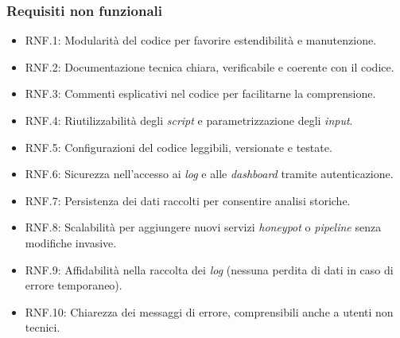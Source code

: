 \subsubsection*{Requisiti non funzionali}
\begin{itemize}[noitemsep, topsep=0pt]
    \item RNF.1: Modularità del codice per favorire estendibilità e manutenzione.
    \item RNF.2: Documentazione tecnica chiara, verificabile e coerente con il codice.
    \item RNF.3: Commenti esplicativi nel codice per facilitarne la comprensione.
    \item RNF.4: Riutilizzabilità degli \textit{script} e parametrizzazione degli \textit{input}.
    \item RNF.5: Configurazioni del codice leggibili, versionate e testate.
    \item RNF.6: Sicurezza nell'accesso ai \textit{log} e alle \textit{dashboard} tramite autenticazione.
    \item RNF.7: Persistenza dei dati raccolti per consentire analisi storiche.
    \item RNF.8: Scalabilità per aggiungere nuovi servizi \textit{honeypot} o \textit{pipeline} senza modifiche invasive.
    \item RNF.9: Affidabilità nella raccolta dei \textit{log} (nessuna perdita di dati in caso di errore temporaneo).
    \item RNF.10: Chiarezza dei messaggi di errore, comprensibili anche a utenti non tecnici.
\end{itemize}

